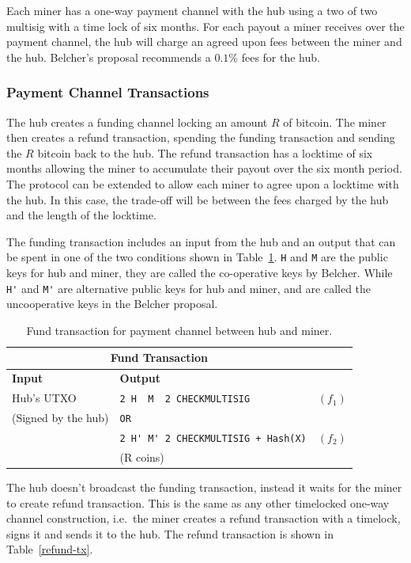 \documentclass{article}
\begin{document}
Each miner has a one-way payment channel with the hub using a two of
two multisig with a time lock of six months. For each payout a miner
receives over the payment channel, the hub will charge an agreed upon
fees between the miner and the hub. Belcher's proposal recommends a
$0.1\%$ fees for the hub.

\subsubsection{Payment Channel Transactions}

The hub creates a funding channel locking an amount $R$ of
bitcoin. The miner then creates a refund transaction, spending the
funding transaction and sending the $R$ bitcoin back to the hub. The
refund transaction has a locktime of six months allowing the miner to
accumulate their payout over the six month period. The protocol can be
extended to allow each miner to agree upon a locktime with the hub. In
this case, the trade-off will be between the fees charged by the hub
and the length of the locktime.

The funding transaction includes an input from the hub and an output
that can be spent in one of the two conditions shown in
Table~\ref{fund-tx}. \verb|H| and \verb|M| are the public keys for hub
and miner, they are called the co-operative keys by Belcher. While
\verb|H'| and \verb|M'| are alternative public keys for hub and miner,
and are called the uncooperative keys in the Belcher proposal.


\begin{table}
  \centering
  \begin{tabular}{ llr }
    \multicolumn{2}{c}{\bfseries Fund Transaction} \\
    \midrule
    \bfseries Input & \bfseries Output \\
    \midrule
    Hub's UTXO & \verb|2 H  M  2 CHECKMULTISIG| & $(f_1)$ \\
    (Signed by the hub) & \verb|OR| \\
                    & \verb|2 H' M' 2 CHECKMULTISIG + Hash(X)| & $(f_2)$ \\
    & (R coins) \\
    \midrule
  \end{tabular}
  \caption{Fund transaction for payment channel between hub and miner.}\label{fund-tx}
\end{table}


The hub doesn't broadcast the funding transaction, instead it waits
for the miner to create refund transaction. This is the same as any
other timelocked one-way channel construction, i.e.\ the miner creates
a refund transaction with a timelock, signs it and sends it to the
hub. The refund transaction is shown in Table~\ref{refund-tx}.
\end{document}
